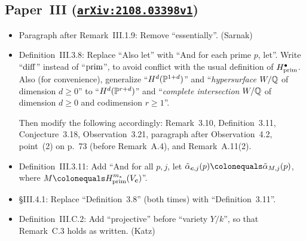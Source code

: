 \documentclass[12pt]{article}
\begin{document}

\subsection{Paper~III (\href{https://arxiv.org/abs/2108.03398v1}{\texttt{arXiv:2108.03398v1}})}

\begin{itemize}
    \item Paragraph after Remark~III.1.9:
    Remove ``essentially''.
    (Sarnak)
    
    \item Definition~III.3.8:
    Replace ``Also let'' with ``And for each prime $p$, let''.
    Write ``$\operatorname{diff}$'' instead of ``$\operatorname{prim}$'',
    to avoid conflict with the usual definition of $H^\bullet_{\operatorname{prim}}$.
    Also (for convenience), generalize ``$H^d(\mathbb{P}^{1+d})$'' and ``\emph{hypersurface} $W/\mathbb{Q}$ of dimension $d\geq 0$''
    to ``$H^d(\mathbb{P}^{r+d})$'' and ``\emph{complete intersection} $W/\mathbb{Q}$ of dimension $d\geq 0$ and codimension $r\geq 1$''.
    
    Then modify the following accordingly:
    Remark~3.10,
    Definition~3.11,
    Conjecture~3.18,
    Observation~3.21,
    paragraph after Observation~4.2,
    point~(2) on p.~73 (before Remark~A.4),
    and Remark~A.11(2).
    
    \item Definition~III.3.11:
    Add ``And for all $p,j$, let $\tilde{\alpha}_{\bm{c},j}(p)\defeq \tilde{\alpha}_{M,j}(p)$, where $M\defeq H^{m_\ast}_{\map{prim}}(V_{\bm{c}})$''.
    
    \item \S{III.4.1}:
    Replace ``Definition~3.8'' (both times) with ``Definition~3.11''.
    
    \item Definition~III.C.2:
    Add ``projective'' before ``variety $Y/k$'',
    so that Remark~C.3 holds as written.
    (Katz)
    
    

\end{itemize}
\end{document}
